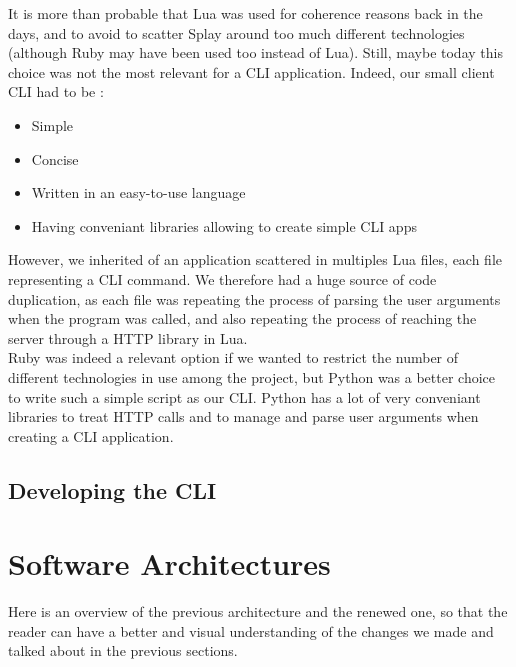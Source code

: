 \documentclass{eplmastersthesis}
\begin{document}
        It is more than probable that Lua was used for coherence reasons back
        in the days, and to avoid to scatter Splay around too much different
        technologies (although Ruby may have been used too instead of Lua).
        Still, maybe today this choice was not the most relevant for a CLI
        application. Indeed, our small client CLI had to be :

        \begin{itemize}
          \item Simple
          \item Concise
          \item Written in an easy-to-use language
          \item Having conveniant libraries allowing to create simple CLI apps
        \end{itemize}

        However, we inherited of an application scattered in multiples Lua
        files, each file representing a CLI command. We therefore had a huge
        source of code duplication, as each file was repeating the process
        of parsing the user arguments when the program was called, and also
        repeating the process of reaching the server through a HTTP library
        in Lua.\\
        Ruby was indeed a relevant option if we wanted to restrict the number
        of different technologies in use among the project, but Python was
        a better choice to write such a simple script as our CLI. Python has
        a lot of very conveniant libraries to treat HTTP calls and to
        manage and parse user arguments when creating a CLI application.

      \subsection{Developing the CLI}

    \section{Software Architectures}

      Here is an overview of the previous architecture and the renewed one,
      so that the reader can have a better and visual understanding
      of the changes we made and talked about in the previous sections.
\end{document}

